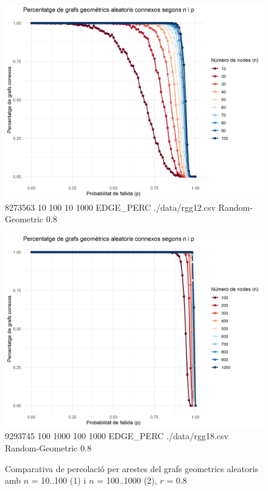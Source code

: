 \documentclass[a4paper]{article}
\begin{document}
	\begin{figure}[h]
		\centering
		\begin{minipage}{0.45\textwidth}
			\centering
			\includegraphics[width=\textwidth]{images/randomGeometric_10-100_0.8}
			\footnotesize{8273563 10 100 10 1000 EDGE\_PERC ./data/rgg12.csv Random-Geometric 0.8}
		\end{minipage}
		\hfill
		\begin{minipage}{0.45\textwidth}
			\centering
			\includegraphics[width=\textwidth]{images/randomGeometric_100-1000_0.8}
			\footnotesize{9293745 100 1000 100 1000 EDGE\_PERC ./data/rgg18.csv Random-Geometric 0.8}
		\end{minipage}
		\caption{Comparativa de percolació per arestes del grafs geometrics aleatoris amb $n$ = 10..100 (1) i $n$ = 100..1000 (2), $r$ = 0.8}
		\label{fig:percolation_edges_rgg_0.8}
	\end{figure}
\end{document}
